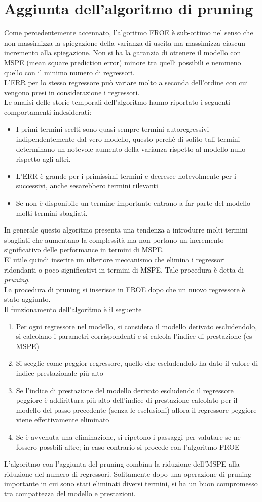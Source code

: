 \documentclass[10pt,a4paper]{book}
\begin{document}
\section{Aggiunta dell'algoritmo di pruning}
Come percedentemente accennato, l'algoritmo FROE è sub-ottimo nel senso che non massimizza la spiegazione della varianza di uscita ma massimizza ciascun incremento alla spiegazione. Non si ha la garanzia di ottenere il modello con MSPE (mean square prediction error) minore tra quelli possibili e nemmeno quello con il minimo numero di regressori.\\
L'ERR per lo stesso regressore può variare molto a seconda dell'ordine con cui vengono presi in considerazione i regressori.\\
Le analisi delle storie temporali dell'algoritmo hanno riportato i seguenti comportamenti indesiderati:
\begin{itemize}
\item I primi termini scelti sono quasi sempre termini autoregressivi indipendentemente dal vero modello, questo perchè di solito tali termini determinano un notevole aumento della varianza rispetto al modello nullo rispetto agli altri.
\item L'ERR è grande per i primissimi termini e decresce notevolmente per i successivi, anche sesarebbero termini rilevanti
\item Se non è disponibile un termine  importante entrano a far parte del modello molti termini sbagliati.
\end{itemize}
In generale questo algoritmo presenta una tendenza a introdurre molti termini sbagliati che aumentano la complessità ma non portano un incremento significativo delle performance in termini di MSPE.\\
E' utile quindi inserire un ulteriore meccanismo che elimina i regressori ridondanti o poco significativi in termini di MSPE. Tale procedura è detta di \emph{pruning}.\\
La procedura di pruning si inserisce in FROE dopo che un nuovo regressore è stato aggiunto.\\
Il funzionamento dell'algoritmo è il seguente
\begin{enumerate}
\item Per ogni regressore nel modello, si considera il modello derivato escludendolo, si calcolano i parametri corrispondenti e si calcola l'indice di prestazione (es MSPE)
\item Si sceglie come peggior regressore, quello che escludendolo ha dato il valore di indice prestazionale più alto
\item Se l'indice di prestazione del modello derivato escludendo il regressore peggiore è addirittura più alto dell'indice di prestazione calcolato per il modello del passo precedente (senza le esclusioni) allora il regressore peggiore viene effettivamente eliminato
\item Se è avvenuta una eliminazione, si ripetono i passaggi per valutare se ne fossero possbili altre; in caso contrario si procede con l'algoritmo FROE
\end{enumerate}
L'algoritmo con l'aggiunta del pruning combina la riduzione dell'MSPE alla riduzione del numero di regressori.
Solitamente dopo una operazione di pruning importante in cui sono stati eliminati diversi termini, si ha un buon compromesso tra compattezza del modello e prestazioni.
\end{document}
